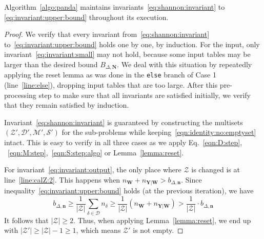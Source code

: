 \documentclass{theoretics}
\newcommand{\calM}{\mathcal M}
\newcommand{\calS}{\mathcal S}
\newcommand{\calD}{\mathcal D}
\newcommand{\calZ}{\mathcal Z}
\begin{document}
\begin{proposition}
Algorithm~\ref{algo:panda} maintains
invariants~\eqref{eq:shannon:invariant} to \eqref{eq:invariant:upper:bound} throughout its
execution.
\label{prop:panda:invariants}
\end{proposition}
\begin{proof}
  We verify that every invariant from~\eqref{eq:shannon:invariant}
  to~\eqref{eq:invariant:upper:bound} holds one by one, by induction. For the input, only
  invariant~\eqref{eq:invariant:small} may not hold, because some input tables may be larger than
  the desired bound $B_{\Delta,\bm N}$. We deal with this situation by repeatedly applying
  the reset lemma  as was done in the {\tt else} branch of Case 1 (line~\ref{line:else}), dropping input tables
  that are too large. After this pre-processing step to make sure that all invariants are
  satisfied initially, we verify that they remain satisfied by induction.

  Invariant~\eqref{eq:shannon:invariant} is guaranteed by constructing the multisets
  $(\calZ', \calD', \calM', \calS')$ for the sub-problems while keeping~\eqref{eqn:identity:no:emptyset}
  intact. This is easy to verify in all three cases as we apply Eq.~\eqref{eqn:D:step},
  ~\eqref{eqn:M:step},~\eqref{eqn:S:step:algo} or Lemma~\ref{lemma:reset}.

  For invariant~\ref{eq:invariant:output}, the only place where $\calZ$ is changed is
  at line~\ref{line:calZ:2}. This happens when $n_{\bm W}+n_{\bm Y|\bm W}>b_{\Delta,\bm n}$.
  Since inequality~\eqref{eq:invariant:upper:bound} holds (at the previous iteration),
  we have
  \[
    b_{\Delta,\bm n}
    \geq \frac{1}{|\calZ|}\sum_{\delta\in\calD}n_\delta
    \geq \frac{1}{|\calZ|}(n_{\bm W}+n_{\bm Y|\bm W})
    > \frac{1}{|\calZ|} \cdot b_{\Delta,\bm n}
  \]
  It follows that $|\calZ| \geq 2$. Thus, when applying Lemma~\ref{lemma:reset}, we end up
  with $|\calZ'| \geq |\calZ|-1 \geq 1$, which means $\calZ'$ is not empty.


\end{proof}
\end{document}
